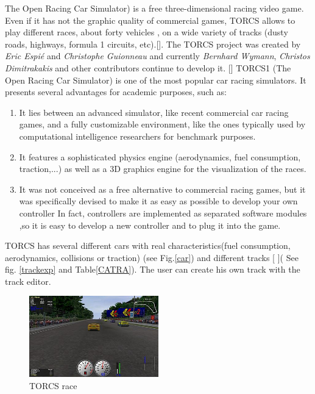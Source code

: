 \documentclass{llncs}
\begin{document}
The Open Racing Car Simulator) is a free three-dimensional racing video game.
Even if it has not the graphic quality of commercial games, TORCS allows to play different races, about forty vehicles , on a wide variety of tracks (dusty roads, highways, formula 1 circuits, etc).[\cite{manuel}]. The TORCS project was created by \textit{Eric Espié} and \textit{Christophe Guionneau} and currently \textit{Bernhard Wymann}, \textit{Christos Dimitrakakis}  and other contributors continue to develop it. [\cite{manual}]
TORCS1 (The Open Racing Car Simulator) is one of the most popular car racing simulators. It 
presents several advantages for academic purposes, such as:
\begin{enumerate}
	
	\item  It lies between an advanced simulator, like recent commercial
	car racing games, and a fully customizable environment,
	like the ones typically used by computational
	intelligence researchers for benchmark purposes.
	\item  It features a sophisticated physics engine (aerodynamics,
	fuel consumption, traction,...) as well as a 3D graphics
	engine for the visualization of the races.
	\item  It was not conceived as a free alternative to commercial
	racing games, but it was specifically devised to make it
	as easy as possible to develop your own controller In fact, controllers are implemented as separated software
	modules ,so it is easy to develop a new controller and to plug
	it into the game.
	
\end{enumerate}

TORCS has several different cars with real characteristics(fuel consumption, aerodynamics, collisions or traction) (see Fig.\ref{car}) and different tracks [\cite{manuel} ]( See fig. \ref{trackexp} and Table\ref{CATRA}). The user can create his own track with the track editor.

\begin{figure}[h!]
	\centering
	\includegraphics[width=0.5\textwidth]{fig/TORCS1.png}
	\begin{minipage}{10cm}
		\centering
		
		\caption{\footnotesize TORCS race}
		\label{0301}
	\end{minipage} 
\end{figure}
\end{document}
